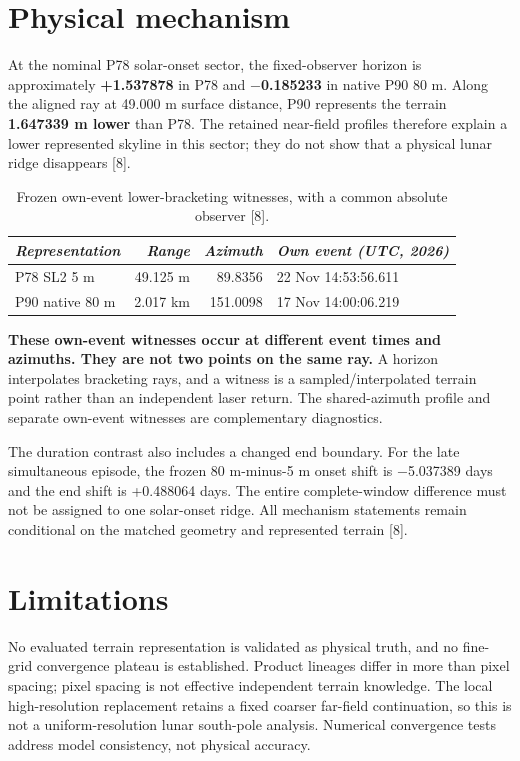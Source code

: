\documentclass[conference,letterpaper]{IEEEtran}
\begin{document}
\section{Physical mechanism}

At the nominal P78 solar-onset sector, the fixed-observer horizon is approximately \textbf{+1.537878\textdegree{}} in P78 and \textbf{$-$0.185233\textdegree{}} in native P90 80 m. Along the aligned ray at 49.000 m surface distance, P90 represents the terrain \textbf{1.647339 m lower} than P78. The retained near-field profiles therefore explain a lower represented skyline in this sector; they do not show that a physical lunar ridge disappears [8].

\begin{table}[!t]\centering
\caption{Frozen own-event lower-bracketing witnesses, with a common absolute observer [8].}
\label{tab:result2}
\small\setlength{\tabcolsep}{6pt}\renewcommand{\arraystretch}{1.12}
\begin{tabular}{@{}lrrl@{}}\toprule
\textit{Representation} & \textit{Range} & \textit{Azimuth} & \textit{Own event (UTC, 2026)}\\\midrule
P78 SL2 5 m & 49.125 m & 89.8356\textdegree{} & 22 Nov 14:53:56.611\\
P90 native 80 m & 2.017 km & 151.0098\textdegree{} & 17 Nov 14:00:06.219\\
\bottomrule\end{tabular}
\end{table}

\textbf{These own-event witnesses occur at different event times and azimuths. They are not two points on the same ray.} A horizon interpolates bracketing rays, and a witness is a sampled/interpolated terrain point rather than an independent laser return. The shared-azimuth profile and separate own-event witnesses are complementary diagnostics.

The duration contrast also includes a changed end boundary. For the late simultaneous episode, the frozen 80 m-minus-5 m onset shift is $-$5.037389 days and the end shift is +0.488064 days. The entire complete-window difference must not be assigned to one solar-onset ridge. All mechanism statements remain conditional on the matched geometry and represented terrain [8].

\section{Limitations}

No evaluated terrain representation is validated as physical truth, and no fine-grid convergence plateau is established. Product lineages differ in more than pixel spacing; pixel spacing is not effective independent terrain knowledge. The local high-resolution replacement retains a fixed coarser far-field continuation, so this is not a uniform-resolution lunar south-pole analysis. Numerical convergence tests address model consistency, not physical accuracy.
\end{document}
